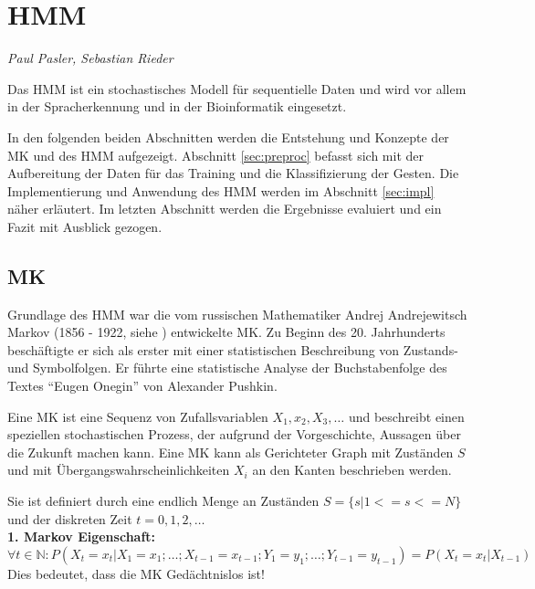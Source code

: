 ﻿\section{\acl{HMM}}
\label{mainsec:hmm}
\textit{Paul Pasler, Sebastian Rieder}

Das \acl{HMM} ist ein stochastisches Modell für sequentielle Daten und wird vor allem in der Spracherkennung und in der Bioinformatik eingesetzt.

In den folgenden beiden Abschnitten werden die Entstehung und Konzepte der \acl{MK} und des \acl{HMM} aufgezeigt.
Abschnitt \ref{sec:preproc} befasst sich mit der Aufbereitung der Daten für das Training und die Klassifizierung der Gesten.
Die Implementierung und Anwendung des \acl{HMM} werden im Abschnitt \ref{sec:impl} näher erläutert. Im letzten Abschnitt werden die Ergebnisse 
evaluiert und ein Fazit mit Ausblick gezogen.  
 
\subsection{\acl{MK}} \label{sec:chain}
Grundlage des \acl{HMM} war die vom russischen Mathematiker Andrej Andrejewitsch Markov 
(1856 - 1922, siehe \cite{markov1913}) entwickelte \acl{MK}. Zu Beginn des
20.
Jahrhunderts beschäftigte er sich als erster mit einer statistischen Beschreibung von Zustands- und Symbolfolgen. 
Er führte eine statistische Analyse der Buchstabenfolge des Textes ``Eugen Onegin'' von Alexander 
Pushkin.

Eine \acl{MK} ist eine Sequenz von Zufallsvariablen \( X_1, x_2, X_3, \ldots\) und beschreibt einen speziellen stochastischen Prozess, 
der aufgrund der Vorgeschichte, Aussagen über die Zukunft machen kann. 
Eine \acl{MK} kann als Gerichteter Graph mit Zuständen \(S\) und mit Übergangswahrscheinlichkeiten \(X_i\) an den Kanten beschrieben werden. 

Sie ist definiert durch eine endlich Menge an Zuständen \( S = \{ s | 1 <= s <= N \} \) und der diskreten Zeit \( t = 0, 1, 2, \ldots \) \\

\textbf{1. Markov Eigenschaft: } \\
\( \forall t \in \mathbb{N} : P (X_t = x_t | X_1 = x_1 ; \ldots ; X_{t-1} = x_{t-1} ; Y_1 = y_1 ; \ldots ; Y_{t-1} = y_{t-1} ) = P (X_t = x_t | X_{t-1} ) \) \\
Dies bedeutet, dass die \acl{MK} Gedächtnislos ist!


